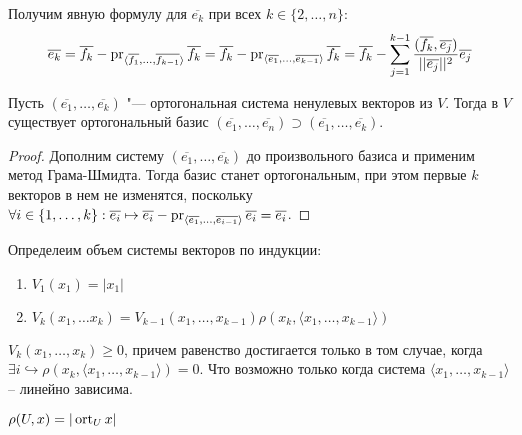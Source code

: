 \begin{note}
	Получим явную формулу для $\overline{e_k}$ при всех $k \in \{2, \dots, n\}$:
	\[\overline{e_k} = \overline{f_k} - \operatorname{pr}_{\langle\overline{f_1}, \dots, \overline{f_{k - 1}}\rangle}{\overline{f_k}} = \overline{f_k} - \operatorname{pr}_{\langle\overline{e_1}, \dots, \overline{e_{k - 1}}\rangle}{\overline{f_k}} = \overline{f_k} - \sum_{j = 1}^{k - 1}\frac{(\overline{f_k}, \overline{e_j})}{||\overline{e_j}||^2}\overline{e_j}\]
\end{note}

\begin{corollary}
	Пусть $(\overline{e_1}, \dots, \overline{e_k})$ "--- ортогональная система ненулевых векторов из $V$. Тогда в $V$ существует ортогональный базис $(\overline{e_1}, \dots, \overline{e_n}) \supset (\overline{e_1}, \dots, \overline{e_k})$.
\end{corollary}

\begin{proof}
	Дополним систему $(\overline{e_1}, \dots, \overline{e_k})$ до произвольного базиса и применим метод Грама-Шмидта. Тогда базис станет ортогональным, при этом первые $k$ векторов в нем не изменятся, поскольку $\forall i \hm{\in} \{1, \dots, k\}: \overline{e_i} \hm{\mapsto} \overline{e_i} - \pr_{\langle\overline{e_1}, \dots, \overline{e_{i - 1}}\rangle}{\overline{e_i}} = \overline{e_i}$.
\end{proof}

\begin{definition}
    Определеим объем системы векторов по индукции:
    \begin{enumerate}
        \item $V_1(x_1) = |x_1|$
        \item $V_k(x_1, \dots x_k) = V_{k -1} (x_1, \dots, x_{k - 1}) \rho(x_k, \langle x_1, \dots, x_{k - 1} \rangle)$
    \end{enumerate}
\end{definition}

\begin{corollary}
    $V_k(x_1, \dots, x_k) \geq 0$, причем равенство достигается только в том случае, когда $\exists i \hookrightarrow \rho(x_k, \langle x_1, \dots, x_{k - 1} \rangle) = 0$. Что возможно только когда система $\langle x_1, \dots, x_{k - 1} \rangle$ -- линейно зависима.
\end{corollary}

\begin{proposition}
    $\rho (U, x) = |\operatorname{ort}_U x|$
\end{proposition}

